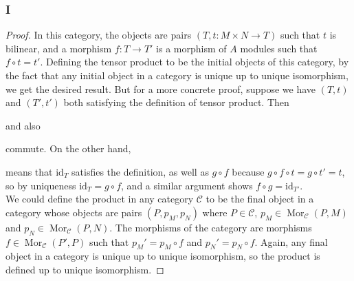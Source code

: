 \documentclass{article}
\newcommand{\id}{\mathrm{id}}
\newcommand{\fC}{\mathscr{C}}
\DeclareMathOperator{\Mor}{\mathrm{Mor}}
\begin{document}
\subsubsection{I}\label{1.3.I}
\begin{proof}
    In this category, the objects are pairs $(T,t:M\times N\to T)$ such that $t$ is bilinear, and a morphism $f:T\to T'$ is a morphism of $A$ modules such that $f\circ t=t'$. Defining the tensor product to be the initial objects of this category, by the fact that any initial object in a category is unique up to unique isomorphism, we get the desired result. But for a more concrete proof, suppose we have $(T,t)$ and $(T',t')$ both satisfying the definition of tensor product. Then
    \begin{center}
    \end{center}
    and also
    \begin{center}
    \end{center}
    commute. On the other hand,
    \begin{center}
    \end{center}
    means that $\id_T$ satisfies the definition, as well as $g\circ f$ because $g\circ f\circ t=g\circ t'=t$, so by uniqueness $\id_T=g\circ f$, and a similar argument shows $f\circ g=\id_{T'}$.\\
    \newline
    We could define the product in any category $\fC$ to be the final object in a category whose objects are pairs $(P,p_M,p_N)$ where $P\in \fC$, $p_M\in \Mor_\fC(P,M)$ and $p_N\in \Mor_\fC(P,N)$. The morphisms of the category are morphisms $f\in \Mor_\fC(P',P)$ such that $p_M'=p_M\circ f$ and $p_N'=p_N\circ f$. Again, any final object in a category is unique up to unique isomorphism, so the product is defined up to unique isomorphism.
\end{proof}
\end{document}
